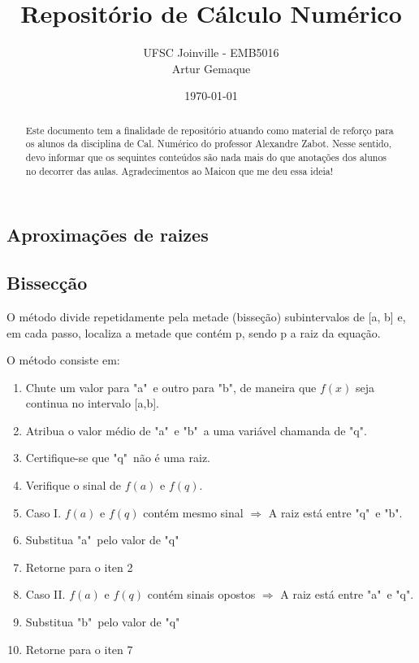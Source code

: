 \documentclass{article}
\title{\textbf{Repositório de Cálculo Numérico}}
\author{UFSC Joinville - EMB5016 \\ Artur Gemaque}
\date{\today}
\begin{document}
\maketitle

\begin{abstract}
    Este documento tem a finalidade de repositório atuando como material de reforço 
    para os alunos da disciplina de Cal. Numérico do professor Alexandre Zabot. Nesse sentido, 
    devo informar que os sequintes conteúdos são nada mais do que anotações 
    dos alunos no decorrer das aulas. Agradecimentos ao Maicon que me deu essa ideia!
\end{abstract}

\begin{multicols}{2}

\section{Aproximações de raizes}
    \subsection{Bissecção}
        O método divide repetidamente pela metade (bisseção) subintervalos de [a, b] e, em cada
        passo, localiza a metade que contém p, sendo p a raiz da equação.

        O método consiste em: 
        \begin{enumerate}
            \item Chute um valor para "a"\ e outro para "b", de maneira que $ f(x) $ seja continua no intervalo [a,b].
            \item Atribua o valor médio de "a"\ e "b"\ a uma variável chamanda de "q".
            \item Certifique-se que "q"\ não é uma raiz.
            \item Verifique o sinal de $ f(a) $ e $ f(q) $.
            \item Caso I. $ f(a) $ e $ f(q) $ contém mesmo sinal $\Longrightarrow $ A raiz está entre "q"\ e "b". 
            \item Substitua "a"\ pelo valor de "q"
            \item Retorne para o iten 2
            \item Caso II. $ f(a) $ e $ f(q) $ contém sinais opostos $\Longrightarrow $ A raiz está entre "a"\ e "q". 
            \item Substitua "b"\ pelo valor de "q"
            \item Retorne para o iten 7
        \end{enumerate}


\end{multicols}
\end{document}
